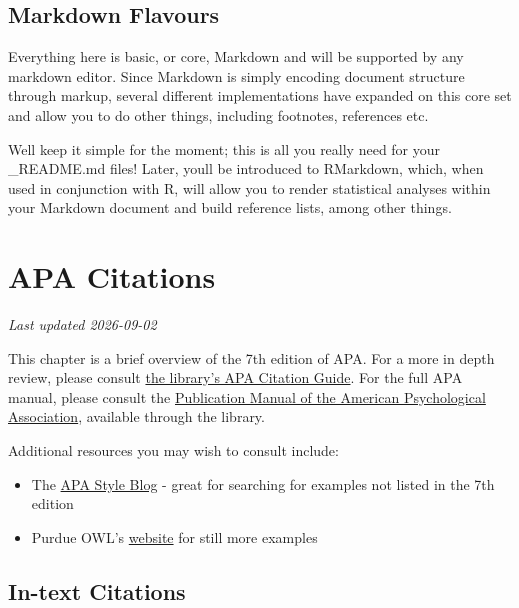 \documentclass[
]{book}
\providecommand{\tightlist}{%
  \setlength{\itemsep}{0pt}\setlength{\parskip}{0pt}}
\begin{document}
\section{Markdown Flavours}\label{markdown-flavours}

Everything here is basic, or core, Markdown and will be supported by any markdown editor. Since Markdown is simply encoding document structure through markup, several different implementations have expanded on this core set and allow you to do other things, including footnotes, references etc.

We\textquotesingle ll keep it simple for the moment; this is all you really need for your \_README.md files! Later, you\textquotesingle ll be introduced to RMarkdown, which, when used in conjunction with R, will allow you to render statistical analyses within your Markdown document and build reference lists, among other things.

\chapter{APA Citations}\label{apa-citations}

\emph{Last updated 2026-09-02}

This chapter is a brief overview of the 7th edition of APA. For a more in depth review, please consult \href{https://guides.library.ubc.ca/apacitationstyle}{the library's APA Citation Guide}. For the full APA manual, please consult the \href{http://resolve.library.ubc.ca/cgi-bin/catsearch?bid=10057275}{Publication Manual of the American Psychological Association}, available through the library.

Additional resources you may wish to consult include:

\begin{itemize}
\tightlist
\item
  The \href{https://apastyle.apa.org/blog/}{APA Style Blog} - great for searching for examples not listed in the 7th edition
\item
  Purdue OWL's \href{https://owl.purdue.edu/owl/research_and_citation/apa_style/apa_formatting_and_style_guide/general_format.html}{website} for still more examples
\end{itemize}

\section{In-text Citations}\label{in-text-citations}
\end{document}
